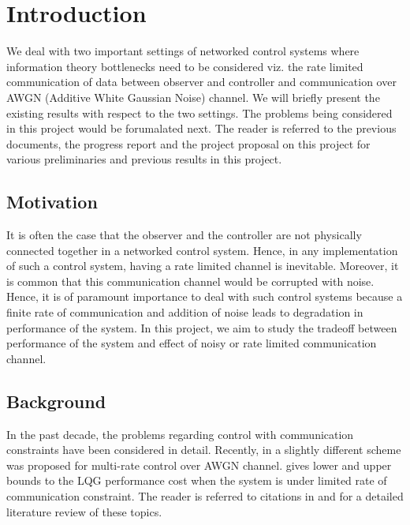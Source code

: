 \documentclass[12pt]{caltech_thesis_progress2}
\begin{document}
\tableofcontents

\mainmatter
\chapter{Introduction}
We deal with two important settings of networked control systems where information theory bottlenecks need to be considered viz. the rate limited communication of data between observer and controller and communication over AWGN (Additive White Gaussian Noise) channel. We will briefly present the existing results with respect to the two settings. The problems being considered in this project would be forumalated next. The reader is referred to the previous documents, the progress report and the project proposal on this project for various preliminaries and previous results in this project. 
	\section{Motivation}
It is often the case that the observer and the controller are not physically connected together in a networked control system. Hence, in any implementation of such a control system, having a rate limited channel is inevitable. Moreover, it is common that this communication channel would be corrupted with noise. Hence, it is of paramount importance to deal with such control systems because a finite rate of communication and addition of noise leads to degradation in performance of the system. In this project, we aim to study the tradeoff between performance of the system and effect of noisy or rate limited communication channel. 
\section{Background}
In the past decade, the problems regarding control with communication constraints have been considered in detail. Recently, in \cite{anatoly} a slightly different scheme was proposed for multi-rate control over AWGN channel. \cite{victoria} gives lower and upper bounds to the LQG performance cost when the system is under limited rate of communication constraint. 
The reader is referred to citations in \cite{anatoly} and \cite{victoria} for a detailed literature review of these topics. 
\end{document}
